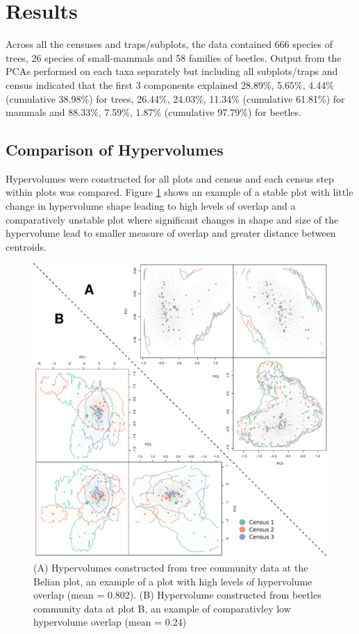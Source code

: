 \section{Results}

Across all the censuses and traps/subplots, the data contained 666 species of trees, 26 species of small-mammals and 58 families of beetles. Output from the PCAs performed on each taxa separately but including all subplots/traps and census indicated that the first 3 components explained 28.89\%, 5.65\%, 4.44\% (cumulative 38.98\%) for trees, 26.44\%, 24.03\%, 11.34\% (cumulative 61.81\%) for mammals and 88.33\%, 7.59\%, 1.87\% (cumulative 97.79\%) for beetles.


\subsection{Comparison of Hypervolumes}

Hypervolumes were constructed for all plots and census and each census step within plots was compared. Figure \ref{fig:1} shows an example of a stable plot with little change in hypervolume shape leading to high levels of overlap and a comparatively unstable plot where significant changes in shape and size of the hypervolume lead to smaller measure of overlap and greater distance between centroids.

\begin{figure}[H]
	\centering
	\includegraphics[width=\textwidth]{figures/figure1.pdf}
	\caption{(A) Hypervolumes constructed from tree community data at the Belian plot, an example of a plot with high levels of hypervolume overlap (mean = 0.802). (B) Hypervolume constructed from beetles community data at plot B, an example of comparativley low hypervolume overlap (mean = 0.24)}
	\label{fig:1}
\end{figure}	


